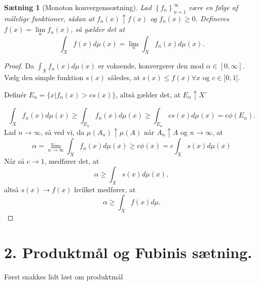 \documentclass[12pt]{report}
\newtheorem{theorem}[lemma]{Sætning}
\theoremstyle{break}
\newtheorem*{proof}{Bevis}
\theoremstyle{break}
\begin{document}
\begin{theorem}[Monoton konvergenssætning]
	Lad $\left\{ f_n \right\}_{n=1}^\infty$ være en følge af målelige funktioner, sådan at $f_n(x)\uparrow f(x)$ og $f_n(x)\geq 0$. Defineres $f(x)= \lim\limits_{n}f_n(x)$, så gælder det at
	\[ \int_X f(x)d\mu (x)=\lim\limits_{n}\int_X f_n(x)d\mu (x).\]
\end{theorem}
\begin{proof}
	Da $\int_X f_n(x)d\mu(x)$ er voksende, konvergerer den mod $\alpha \in [0,\infty]$. Vælg den simple funktion $s(x)$ således, at $s(x)\leq f(x) \forall x$ og $c\in ]0,1[$.
	
	\bigskip
	
	Definér $E_n=\{x|f_n(x)>cs(x)\}$, altså gælder det, at $E_n\uparrow X$'
	
	\bigskip
	
	\[\int_X f_n(x)d\mu(x)\geq \int_{E_n}f_n(x)d\mu(x) \geq \int_{E_n}cs(x)d\mu(x)=c\phi(E_n).\]
	Lad $n\to \infty$, så ved vi, da $\mu (A_n)\uparrow\mu(A)$ når $A_n\uparrow A$ og $n\to \infty$, at 
	\[ \alpha=\lim\limits_{n\to\infty}\int_X f_n(x)d\mu(x)\geq c\phi(x)=c\int_Xs(x) d\mu(x) \]
	Når så $c\to 1$, medfører det, at
	\[ \alpha \geq \int_X s(x) d\mu(x), \]
	altså $s(x)\to f(x)$ hvilket medfører, at
	\[ \alpha \geq \int_X f(x) d\mu. \]
\end{proof}
\newpage

\section*{2. Produktmål og Fubinis sætning.}
Først snakkes lidt løst om produktmål

\bigskip
\end{document}
